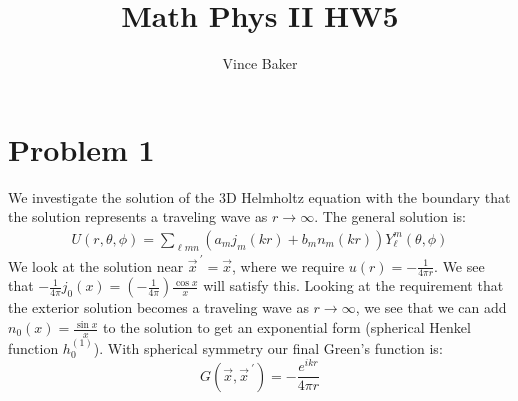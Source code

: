 \documentclass[a4paper,12pt]{article}
\title{Math Phys II HW5}
\author{Vince Baker}
\numberwithin{equation}{section}
\begin{document}
\maketitle

\section{Problem 1}
We investigate the solution of the 3D Helmholtz equation with the boundary that the solution represents a traveling wave as $r\rightarrow\infty$.
The general solution is:
\begin{gather}
 U(r,\theta,\phi)=\sum_{\ell mn}(a_mj_m(kr)+b_mn_m(kr) )Y_{\ell}^{m}(\theta, \phi)
\end{gather}
We look at the solution near $\vec{x}^{\ '}=\vec{x}$, where we require $u(r)=-\frac{1}{4\pi r}$.
We see that $-\frac{1}{4\pi}j_0(x)=(-\frac{1}{4\pi})\frac{\cos x}{x}$ will satisfy this. 
Looking at the requirement that the exterior solution becomes a traveling wave as $r\rightarrow\infty$, we see that we can add $n_0(x)=\frac{\sin x}{x}$ to the solution to get an exponential form 
(spherical Henkel function $h_0^{(1)}$).
With spherical symmetry our final Green's function is:
\begin{equation}
 G(\vec{x}, \vec{x}^{\ '})=-\frac{e^{ikr}}{4\pi r}
\end{equation}
\end{document}
